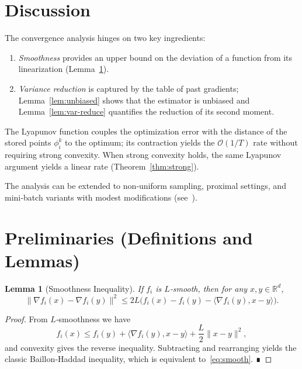 \documentclass{article}
\newtheorem{lemma}{Lemma}[section]
\begin{document}
\section{Discussion}
The convergence analysis hinges on two key ingredients:
\begin{enumerate}
\item \emph{Smoothness} provides an upper bound on the deviation of a function from its linearization (Lemma~\ref{lem:smooth}).
\item \emph{Variance reduction} is captured by the table of past gradients; Lemma~\ref{lem:unbiased} shows that the estimator is unbiased and Lemma~\ref{lem:var-reduce} quantifies the reduction of its second moment.
\end{enumerate}
The Lyapunov function couples the optimization error with the distance of the stored points $\phi_i^k$ to the optimum; its contraction yields the $\mathcal{O}(1/T)$ rate without requiring strong convexity. When strong convexity holds, the same Lyapunov argument yields a linear rate (Theorem~\ref{thm:strong}).  

The analysis can be extended to non‑uniform sampling, proximal settings, and mini‑batch variants with modest modifications (see~\cite{defazio2014saga}).

\section{Preliminaries (Definitions and Lemmas)}
\begin{lemma}[Smoothness Inequality]\label{lem:smooth}
If $f_i$ is $L$‑smooth, then for any $x,y\in\mathbb{R}^d$,
\[
\|\nabla f_i(x)-\nabla f_i(y)\|^{2}\le 2L\bigl(f_i(x)-f_i(y)-\langle\nabla f_i(y),x-y\rangle\bigr).
\tag{3}
\]
\end{lemma}
\begin{proof}
From $L$‑smoothness we have
\[
f_i(x)\le f_i(y)+\langle\nabla f_i(y),x-y\rangle+\frac{L}{2}\|x-y\|^{2},
\]
and convexity gives the reverse inequality. Subtracting and rearranging yields the classic Baillon‑Haddad inequality, which is equivalent to~\eqref{eq:smooth}. ∎
\end{proof}
\end{document}

